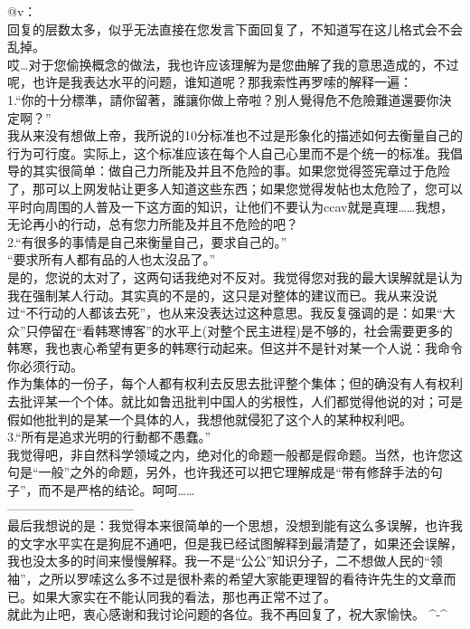 \begin{itemize}[<+->]
  @v：\\
  回复的层数太多，似乎无法直接在您发言下面回复了，不知道写在这儿格式会不会乱掉。\\
  哎\ldots{}对于您偷换概念的做法，我也许应该理解为是您曲解了我的意思造成的，不过呢，也许是我表达水平的问题，谁知道呢？那我索性再罗嗦的解释一遍：\\
  1.``你的十分標準，請你留著，誰讓你做上帝啦？別人覺得危不危險難道還要你決定啊？''\\
  我从来没有想做上帝，我所说的10分标准也不过是形象化的描述如何去衡量自己的行为可行度。实际上，这个标准应该在每个人自己心里而不是个统一的标准。我倡导的其实很简单：做自己力所能及并且不危险的事。如果您觉得签宪章过于危险了，那可以上网发帖让更多人知道这些东西；如果您觉得发帖也太危险了，您可以平时向周围的人普及一下这方面的知识，让他们不要认为ccav就是真理\ldots{}\ldots{}我想，无论再小的行动，总有您力所能及并且不危险的吧？\\
  2.``有很多的事情是自己來衡量自己，要求自己的。''\\
  ``要求所有人都有品的人也太沒品了。''\\
  是的，您说的太对了，这两句话我绝对不反对。我觉得您对我的最大误解就是认为我在强制某人行动。其实真的不是的，这只是对整体的建议而已。我从来没说过``不行动的人都该去死''，也从来没表达过这种意思。我反复强调的是：如果``大众''只停留在``看韩寒博客''的水平上(对整个民主进程)是不够的，社会需要更多的韩寒，我也衷心希望有更多的韩寒行动起来。但这并不是针对某一个人说：我命令你必须行动。\\
  作为集体的一份子，每个人都有权利去反思去批评整个集体；但的确没有人有权利去批评某一个个体。就比如鲁迅批判中国人的劣根性，人们都觉得他说的对；可是假如他批判的是某一个具体的人，我想他就侵犯了这个人的某种权利吧。\\
  3.``所有是追求光明的行動都不愚蠢。''\\
  我觉得吧，非自然科学领域之内，绝对化的命题一般都是假命题。当然，也许您这句是``一般''之外的命题，另外，也许我还可以把它理解成是``带有修辞手法的句子''，而不是严格的结论。呵呵\ldots{}\ldots{}\\
  ------------------------------\\
  最后我想说的是：我觉得本来很简单的一个思想，没想到能有这么多误解，也许我的文字水平实在是狗屁不通吧，但是我已经试图解释到最清楚了，如果还会误解，我也没太多的时间来慢慢解释。我一不是``公公''知识分子，二不想做人民的``领袖''，之所以罗嗦这么多不过是很朴素的希望大家能更理智的看待许先生的文章而已。如果大家实在不能认同我的看法，那也再正常不过了。\\
  就此为止吧，衷心感谢和我讨论问题的各位。我不再回复了，祝大家愉快。
  \^{}-\^{}
\end{itemize}

